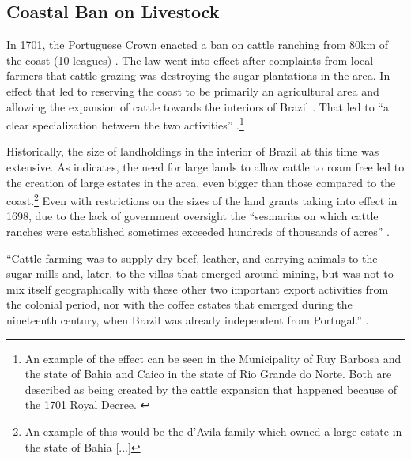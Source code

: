 \documentclass{article}
\begin{document}
\subsection{Coastal Ban on Livestock}

In 1701, the Portuguese Crown enacted a ban on cattle ranching from 80km of the coast (10 leagues) \parencites[p~.40]{Fausto2014-bh}[p~.198]{Simonsen2005-ps}[p~.460]{Bethell1984-of}. 
The law went into effect after complaints from local farmers that cattle grazing was destroying the sugar plantations in the area. 
In effect that led to reserving the coast to be primarily an agricultural area and allowing the expansion of cattle towards the interiors of Brazil \parencite[p.~216]{Junior1967-jv}.
That led to ``a clear specialization between the two activities'' \parencite{Ribeiro2012-lb}.\footnote{An example of the effect can be seen in the Municipality of Ruy Barbosa and the state of Bahia and Caico in the state of Rio Grande do Norte. Both are described as being created by the cattle expansion that happened because of the 1701 Royal Decree. \parencite{UnknownUnknown-ro}}


Historically, the size of landholdings in the interior of Brazil at this time was extensive. 
As \textcite[p~.41]{Fausto2014-bh} indicates, the need for large lands to allow cattle to roam free led to the creation of large estates in the area, even bigger than those compared to the coast.\footnote{An example of this would be the d'Avila family which owned a large estate in the state of Bahia [...]}
Even with restrictions on the sizes of the land grants taking into effect in 1698, due to the lack of government oversight the  ``sesmarias on which cattle ranches were established sometimes exceeded hundreds of thousands of acres'' \parencite{Bethell1984-of}.


\parencite[p~.]{Boxer1962-bj}

``Cattle farming was to supply dry beef, leather, and carrying animals to the sugar mills and, later, to the villas that emerged around mining, but was not to mix itself geographically with these other two important export activities from the colonial period, nor with the coffee estates that emerged during the nineteenth century,  when  Brazil was already independent from  Portugal.'' \parencite{Ribeiro2012-lb}.
\end{document}
